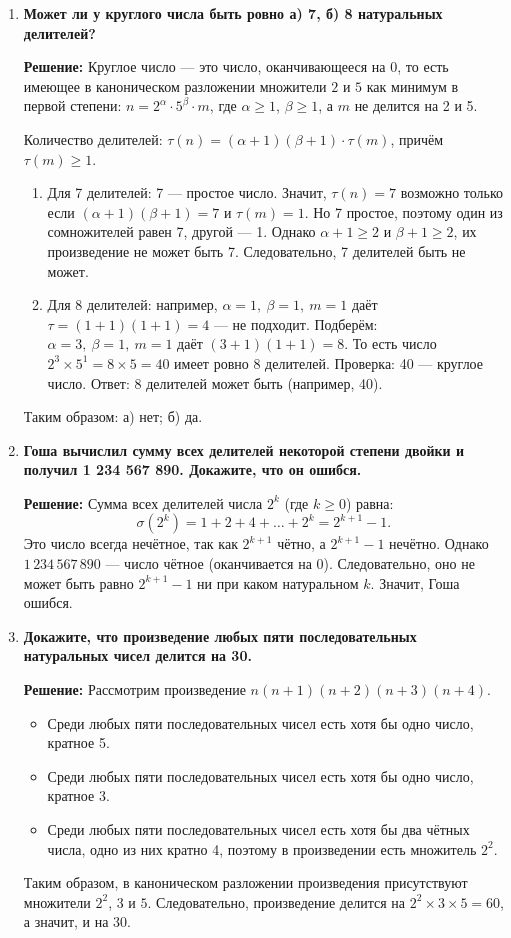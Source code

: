 \documentclass[12pt, a4paper]{article}
\begin{document}
\begin{enumerate}[label=\arabic*., wide=0pt, leftmargin=*]
\item \textbf{Может ли у круглого числа быть ровно а) 7, б) 8 натуральных делителей?}

\textbf{Решение:} 
Круглое число — это число, оканчивающееся на 0, то есть имеющее в каноническом разложении множители \(2\) и \(5\) как минимум в первой степени: \(n = 2^{\alpha} \cdot 5^{\beta} \cdot m\), где \(\alpha \ge 1\), \(\beta \ge 1\), а \(m\) не делится на 2 и 5.

Количество делителей: \(\tau(n) = (\alpha+1)(\beta+1) \cdot \tau(m)\), причём \(\tau(m) \ge 1\).

\begin{enumerate}[label=\alph*), wide=0pt, leftmargin=*]
\item Для 7 делителей: 7 — простое число. Значит, \(\tau(n) = 7\) возможно только если \((\alpha+1)(\beta+1) = 7\) и \(\tau(m)=1\). Но 7 простое, поэтому один из сомножителей равен 7, другой — 1. Однако \(\alpha+1 \ge 2\) и \(\beta+1 \ge 2\), их произведение не может быть 7. Следовательно, 7 делителей быть не может.

\item Для 8 делителей: например, \(\alpha=1,\ \beta=1,\ m=1\) даёт \(\tau = (1+1)(1+1) = 4\) — не подходит. Подберём: \(\alpha=3,\ \beta=1,\ m=1\) даёт \((3+1)(1+1)=8\). То есть число \(2^3 \times 5^1 = 8 \times 5 = 40\) имеет ровно 8 делителей. Проверка: 40 — круглое число. Ответ: 8 делителей может быть (например, 40).
\end{enumerate}
Таким образом: а) нет; б) да.

\item \textbf{Гоша вычислил сумму всех делителей некоторой степени двойки и получил 1 234 567 890. Докажите, что он ошибся.}

\textbf{Решение:}
Сумма всех делителей числа \(2^k\) (где \(k \ge 0\)) равна:
\[
\sigma(2^k) = 1 + 2 + 4 + \dots + 2^k = 2^{k+1} - 1.
\]
Это число всегда нечётное, так как \(2^{k+1}\) чётно, а \(2^{k+1} - 1\) нечётно.
Однако \(1\,234\,567\,890\) — число чётное (оканчивается на 0). Следовательно, оно не может быть равно \(2^{k+1}-1\) ни при каком натуральном \(k\). Значит, Гоша ошибся.

\item \textbf{Докажите, что произведение любых пяти последовательных натуральных чисел делится на 30.}

\textbf{Решение:}
Рассмотрим произведение \(n(n+1)(n+2)(n+3)(n+4)\).

\begin{itemize}
\item Среди любых пяти последовательных чисел есть хотя бы одно число, кратное 5.
\item Среди любых пяти последовательных чисел есть хотя бы одно число, кратное 3.
\item Среди любых пяти последовательных чисел есть хотя бы два чётных числа, одно из них кратно 4, поэтому в произведении есть множитель \(2^2\).
\end{itemize}
Таким образом, в каноническом разложении произведения присутствуют множители \(2^2\), \(3\) и \(5\). Следовательно, произведение делится на \(2^2 \times 3 \times 5 = 60\), а значит, и на \(30\).

\end{enumerate}
\end{document}
